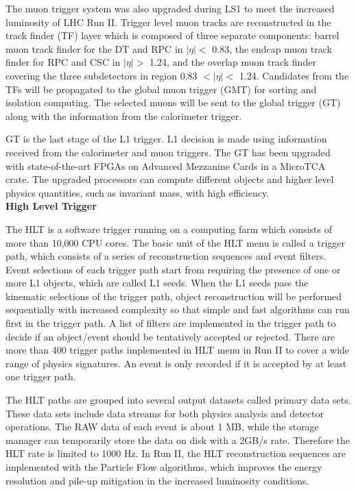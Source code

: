 \documentclass[thesis.tex]{subfiles}
\begin{document}
The muon trigger system was also upgraded during LS1 to meet the increased luminosity of LHC Run II. 
Trigger level muon tracks are reconstructed in the track finder (TF) layer which is composed of three separate components: barrel muon track finder for the DT and RPC in $|\eta| < $ 0.83, the endcap muon track finder for RPC and CSC in $|\eta| > $ 1.24, and the overlap muon track finder covering the three subdetectors in region 0.83 $< |\eta| <$ 1.24. 
Candidates from the TFs will be propagated to the global muon trigger (GMT) for sorting and isolation computing. 
The selected muons will be sent to the global trigger (GT) along with the information from the calorimeter trigger.

GT is the last stage of the L1 trigger. 
L1 decision is made using information received from the calorimeter and muon triggers. 
The GT has been upgraded with state-of-the-art FPGAs on Advanced Mezzanine Cards in a MicroTCA crate.
The upgraded processors can compute different objects and higher level physics quantities, such as invariant mass, with high efficiency.
\\

\noindent \textbf{High Level Trigger}

The HLT is a software trigger running on a computing farm which consists of more than 10,000 CPU cores. 
The basic unit of the HLT menu is called a trigger path, which consists of a series of reconstruction sequences and event filters. 
Event selections of each trigger path start from requiring the presence of one or more L1 objects, which are called L1 seeds. 
When the L1 seeds pass the kinematic selections of the trigger path, object reconstruction will be performed sequentially with increased complexity so that simple and fast algorithms can run first in the trigger path. 
A list of filters are implemented in the trigger path to decide if an object/event should be tentatively accepted or rejected. 
There are more than 400 trigger paths implemented in HLT menu in Run II to cover a wide range of physics signatures.
An event is only recorded if it is accepted by at least one trigger path. 

The HLT paths are grouped into several output datasets called primary data sets. 
These data sets include data streams for both physics analysis and detector operations. 
The RAW data of each event is about 1 MB, while the storage manager can temporarily store the data on disk with a 2GB/s rate. 
Therefore the HLT rate is limited to 1000 Hz.
In Run II, the HLT reconstruction sequences are implemented with the Particle Flow algorithms, which improves the energy resolution and pile-up mitigation in the increased luminosity conditions. 
\end{document}

